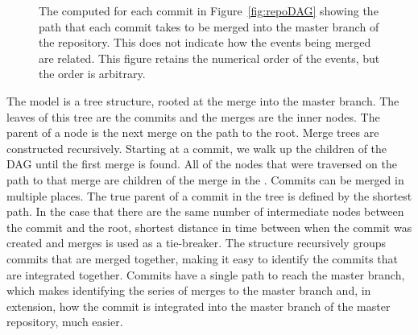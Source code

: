 \begin{figure}[htpb]
  \centering
  \caption{The  computed for each commit in
    Figure~\ref{fig:repoDAG} showing the path that each commit takes to
    be merged into the master branch of the repository. This does not
    indicate how the events being merged are related. This figure
    retains the numerical order of the events, but the order is
    arbitrary.}
  \label{fig:repoTree}
\end{figure}

The \mt{} model is a tree structure,
rooted at the merge into the master branch.
The leaves of this tree are the commits and the merges are the inner
nodes.
The parent of a node is the next merge on the path to the root.
Merge trees are constructed recursively.
Starting at a commit, we walk up the children of the DAG until the
first merge is found.
All of the nodes that were traversed on the path to that merge are
children of the merge in the \mt{}.
Commits can be merged in multiple places.
The true parent of a commit in the tree is defined by the shortest path.
In the case that there are the same number of intermediate nodes
between the commit and the root, shortest distance in time between when
the commit was created and merges is used as a tie-breaker.
The structure recursively groups commits that are merged together,
making it easy to identify the commits that are integrated together.
Commits have a single path to reach the master branch, which makes
identifying the series of merges to the master branch and, in extension,
how the commit is integrated into the master branch of the master
repository, much easier.

